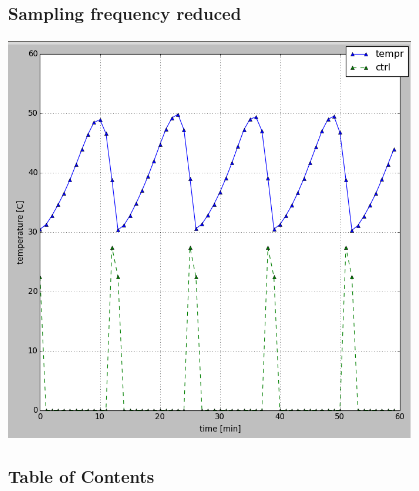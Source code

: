 \documentclass{beamer}
\begin{document}
\begin{frame}

\frametitle{Sampling frequency reduced}
\includegraphics[width=0.8\textwidth]{../images/exp_relay_slow}~
\end{frame}

\begin{frame}
\frametitle{Table of Contents}
\tableofcontents
\end{frame}
\end{document}
